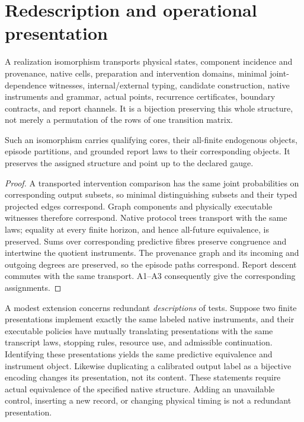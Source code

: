 \section{Redescription and operational presentation}\label{section:completion:redescription-covariance}
A realization isomorphism transports physical states, component incidence and provenance, native cells, preparation and intervention domains, minimal joint-dependence witnesses, internal/external typing, candidate construction, native instruments and grammar, actual points, recurrence certificates, boundary contracts, and report channels. It is a bijection preserving this whole structure, not merely a permutation of the rows of one transition matrix.

\begin{theorem}\label{thm:covariance}
Such an isomorphism carries qualifying cores, their all-finite endogenous objects, episode partitions, and grounded report laws to their corresponding objects. It preserves the assigned structure and point up to the declared gauge.
\end{theorem}
\begin{proof}
A transported intervention comparison has the same joint probabilities on corresponding output subsets, so minimal distinguishing subsets and their typed projected edges correspond. Graph components and physically executable witnesses therefore correspond. Native protocol trees transport with the same laws; equality at every finite horizon, and hence all-future equivalence, is preserved. Sums over corresponding predictive fibres preserve congruence and intertwine the quotient instruments. The provenance graph and its incoming and outgoing degrees are preserved, so the episode paths correspond. Report descent commutes with the same transport. A1--A3 consequently give the corresponding assignments.
\end{proof}

A modest extension concerns redundant \emph{descriptions} of tests. Suppose two finite presentations implement exactly the same labeled native instruments, and their executable policies have mutually translating presentations with the same transcript laws, stopping rules, resource use, and admissible continuation. Identifying these presentations yields the same predictive equivalence and instrument object. Likewise duplicating a calibrated output label as a bijective encoding changes its presentation, not its content. These statements require actual equivalence of the specified native structure. Adding an unavailable control, inserting a new record, or changing physical timing is not a redundant presentation.

